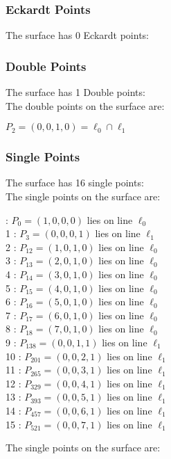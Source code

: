 \documentclass{article}
\begin{document}
{\subsubsection*{Eckardt Points}
The surface has 0 Eckardt points:\\
\subsubsection*{Double Points}
The surface has 1 Double points:\\
The double points on the surface are:\\
\begin{multicols}{2}
\noindent
$P_{2} = ( 0, 0, 1, 0 ) = \ell_{0} \cap \ell_{1} $\\
\end{multicols}
\subsubsection*{Single Points}
The surface has 16 single points:\\
The single points on the surface are:\\
\begin{multicols}{2}
 : $P_{0}=( 1, 0, 0, 0 )$ lies on line $\ell_{0}$\\
1 : $P_{3}=( 0, 0, 0, 1 )$ lies on line $\ell_{1}$\\
2 : $P_{12}=( 1, 0, 1, 0 )$ lies on line $\ell_{0}$\\
3 : $P_{13}=( 2, 0, 1, 0 )$ lies on line $\ell_{0}$\\
4 : $P_{14}=( 3, 0, 1, 0 )$ lies on line $\ell_{0}$\\
5 : $P_{15}=( 4, 0, 1, 0 )$ lies on line $\ell_{0}$\\
6 : $P_{16}=( 5, 0, 1, 0 )$ lies on line $\ell_{0}$\\
7 : $P_{17}=( 6, 0, 1, 0 )$ lies on line $\ell_{0}$\\
8 : $P_{18}=( 7, 0, 1, 0 )$ lies on line $\ell_{0}$\\
9 : $P_{138}=( 0, 0, 1, 1 )$ lies on line $\ell_{1}$\\
10 : $P_{201}=( 0, 0, 2, 1 )$ lies on line $\ell_{1}$\\
11 : $P_{265}=( 0, 0, 3, 1 )$ lies on line $\ell_{1}$\\
12 : $P_{329}=( 0, 0, 4, 1 )$ lies on line $\ell_{1}$\\
13 : $P_{393}=( 0, 0, 5, 1 )$ lies on line $\ell_{1}$\\
14 : $P_{457}=( 0, 0, 6, 1 )$ lies on line $\ell_{1}$\\
15 : $P_{521}=( 0, 0, 7, 1 )$ lies on line $\ell_{1}$\\
\end{multicols}
The single points on the surface are:\\
}
\end{document}
